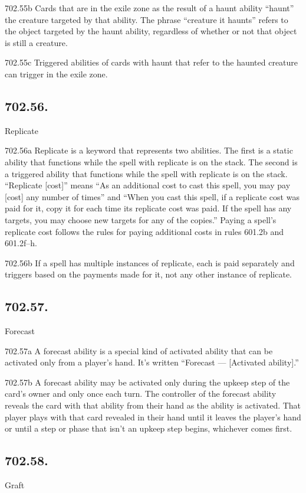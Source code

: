 702.55b Cards that are in the exile zone as the result of a haunt ability “haunt” the creature targeted by that ability. The phrase “creature it haunts” refers to the object targeted by the haunt ability, regardless of whether or not that object is still a creature.

702.55c Triggered abilities of cards with haunt that refer to the haunted creature can trigger in the exile zone.

\subsection*{702.56.}
Replicate

702.56a Replicate is a keyword that represents two abilities. The first is a static ability that functions while the spell with replicate is on the stack. The second is a triggered ability that functions while the spell with replicate is on the stack. “Replicate [cost]” means “As an additional cost to cast this spell, you may pay [cost] any number of times” and “When you cast this spell, if a replicate cost was paid for it, copy it for each time its replicate cost was paid. If the spell has any targets, you may choose new targets for any of the copies.” Paying a spell’s replicate cost follows the rules for paying additional costs in rules 601.2b and 601.2f–h.

702.56b If a spell has multiple instances of replicate, each is paid separately and triggers based on the payments made for it, not any other instance of replicate.

\subsection*{702.57.}
Forecast

702.57a A forecast ability is a special kind of activated ability that can be activated only from a player’s hand. It’s written “Forecast — [Activated ability].”

702.57b A forecast ability may be activated only during the upkeep step of the card’s owner and only once each turn. The controller of the forecast ability reveals the card with that ability from their hand as the ability is activated. That player plays with that card revealed in their hand until it leaves the player’s hand or until a step or phase that isn’t an upkeep step begins, whichever comes first.

\subsection*{702.58.}
Graft

